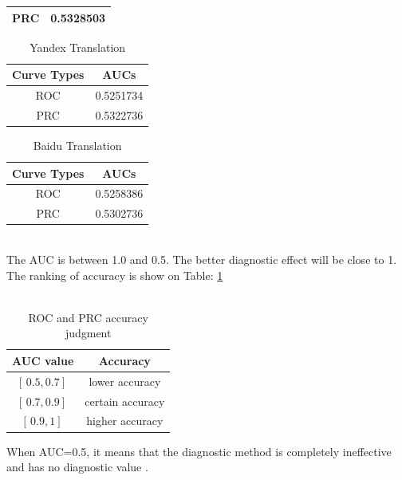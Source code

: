 \documentclass[conference]{IEEEtran}
\begin{document}
\begin{CJK*}{UTF8}{gbsn}
\begin{enumerate}
\begin{table}[h]
\begin{center}
\begin{tabular}{|c|c|}
        \hline
        PRC & 0.5328503 \\
        \hline
      \end{tabular}
    \end{center}
  \end{table}
   \begin{table}[h]
     \caption {Yandex Translation}
     \begin{center}
       \begin{tabular}{|c|c|}
         \hline
         Curve Types & AUCs \\
         \hline\hline
         ROC & 0.5251734 \\
         \hline
         PRC & 0.5322736 \\
         \hline
       \end{tabular}
     \end{center}
   \end{table}
  \begin{table}[h]
    \caption {Baidu Translation}
    \begin{center}
      \begin{tabular}{|c|c|}
        \hline
        Curve Types & AUCs \\
        \hline\hline
        ROC & 0.5258386 \\
        \hline
        PRC & 0.5302736 \\
        \hline
      \end{tabular}
    \end{center}
  \end{table}\\
  The AUC is between 1.0 and 0.5. The better diagnostic effect will be close to
  1. The ranking of accuracy is show on Table: \ref{accuracyJudgment}\\\\
  \begin{table}[h]\label{accuracyJudgment}
    \caption {ROC and PRC accuracy judgment}
     \begin{center}
       \begin{tabular}{|c|c|}
         \hline
         AUC value & Accuracy \\
         \hline\hline
         $[ \, 0.5, 0.7] \,$ & lower accuracy \\
         \hline
         $[ \, 0.7, 0.9] \,$ & certain accuracy \\
         \hline
         $[ \, 0.9, 1] \,$ & higher accuracy \\
         \hline
       \end{tabular}
     \end{center}
   \end{table}
  When AUC=0.5, it means that the diagnostic method is completely ineffective
  and has no diagnostic value \cite{baiduROC}.
\end{enumerate}

\end{CJK*}
\end{document}
